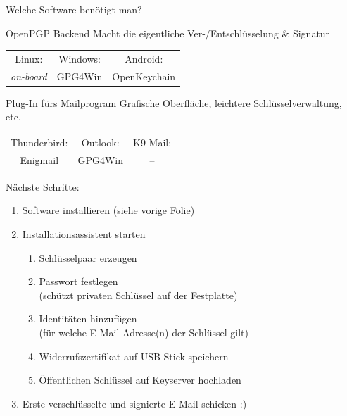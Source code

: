 \begin{frame}{Welche Software benötigt man?}
  \begin{block}{OpenPGP Backend}
    Macht die eigentliche Ver-/Entschlüsselung \& Signatur

    \vspace{1ex}
    \begin{tabular}{ccc}
      Linux:            & Windows: & Android:     \\
      \textit{on-board} & GPG4Win  & OpenKeychain \\
    \end{tabular}
  \end{block}
  \begin{block}{Plug-In fürs Mailprogram}
    Grafische Oberfläche, leichtere Schlüsselverwaltung, etc.

    \vspace{1ex}
    \begin{tabular}{ccc}
      Thunderbird: & Outlook: & K9-Mail: \\
      Enigmail     & GPG4Win  & --       \\
    \end{tabular}
  \end{block}
\end{frame}

\begin{frame}{Nächste Schritte:}
  \begin{enumerate}
    \item Software installieren (siehe vorige Folie)
    \item Installationsassistent starten
    \begin{enumerate}
      \item Schlüsselpaar erzeugen
      \item Passwort festlegen\\ (schützt privaten Schlüssel auf der Festplatte)
      \item Identitäten hinzufügen\\ (für welche E-Mail-Adresse(n) der Schlüssel gilt)
      \item Widerrufszertifikat auf USB-Stick speichern
      \item Öffentlichen Schlüssel auf Keyserver hochladen
    \end{enumerate}
    \item Erste verschlüsselte und signierte E-Mail schicken :)
  \end{enumerate}
\end{frame}

\endinput
